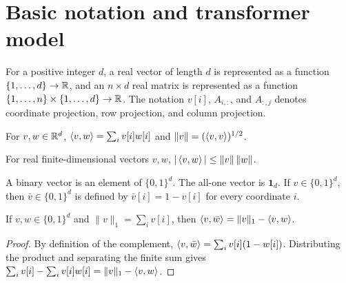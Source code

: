 %

\chapter{Basic notation and transformer model}

\begin{definition}
  \label{def:finite-real-arrays}
  \mathlibok
  For a positive integer $d$, a real vector of length $d$ is represented as a
  function $\{1,\ldots,d\}\to\mathbb{R}$, and an $n\times d$ real matrix is represented
  as a function $\{1,\ldots,n\}\times\{1,\ldots,d\}\to\mathbb{R}$.  The notation
  $v[i]$, $A_{i,:}$, and $A_{:,j}$ denotes coordinate projection, row projection,
  and column projection.
\end{definition}

\begin{definition}
  \label{def:inner-norm}
  \mathlibok
  For $v,w\in\mathbb{R}^d$, $\left\langle v,w\right\rangle=\sum_i v[i]w[i]$ and
  $\|v\|=(\left\langle v,v\right\rangle)^{1/2}$.
\end{definition}

\begin{lemma}
  \label{lem:cauchy-schwarz}
  \mathlibok
  For real finite-dimensional vectors $v,w$, $|\left\langle v,w\right\rangle|\leq\|v\|\,\|w\|$.
\end{lemma}

\begin{definition}
  \label{def:binary-vector-ops}
  A binary vector is an element of $\{0,1\}^d$.  The all-one vector is
  $\mathbf{1}_d$.  If $v\in\{0,1\}^d$, then $\bar v\in\{0,1\}^d$ is defined by
  $\bar v[i]=1-v[i]$ for every coordinate $i$.
\end{definition}

\begin{lemma}
  \label{lem:binary-complement-inner}
  If $v,w\in\{0,1\}^d$ and $\|v\|_1=\sum_i v[i]$, then
  $\left\langle v,\bar w\right\rangle=\|v\|_1-\left\langle v,w\right\rangle$.
\end{lemma}
\begin{proof}
  By definition of the complement,
  $\left\langle v,\bar w\right\rangle=\sum_i v[i](1-w[i])$.  Distributing the product and separating
  the finite sum gives $\sum_i v[i]-\sum_i v[i]w[i]=\|v\|_1-\left\langle v,w\right\rangle$.
\end{proof}

